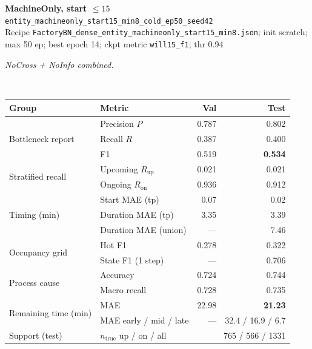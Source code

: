\documentclass[9pt,a4paper,twocolumn]{extarticle}
\begin{document}
\noindent\begin{minipage}{\columnwidth}
\begin{center}
{\small\bfseries MachineOnly, start $\le 15$}\\
{\scriptsize\texttt{entity\_machineonly\_start15\_min8\_cold\_ep50\_seed42}}\\
{\scriptsize Recipe \texttt{FactoryBN\_dense\_entity\_machineonly\_start15\_min8.json}; init scratch; max 50 ep; best epoch 14; ckpt metric \texttt{will15\_f1}; thr 0.94}\\[1pt]
\parbox{0.96\columnwidth}{\scriptsize\itshape NoCross + NoInfo combined.}\\[2pt]
\scriptsize\setlength{\tabcolsep}{3pt}
\begin{tabular}{llrr}
\toprule
Group & Metric & Val & Test \\
\midrule
\multirow{3}{*}{Bottleneck report}
  & Precision $P$ & 0.787 & 0.802 \\
  & Recall $R$ & 0.387 & 0.400 \\
  & F1 & 0.519 & \textbf{0.534} \\
\midrule
\multirow{2}{*}{Stratified recall}
  & Upcoming $R_{\mathrm{up}}$ & 0.021 & 0.021 \\
  & Ongoing $R_{\mathrm{on}}$ & 0.936 & 0.912 \\
\midrule
\multirow{3}{*}{Timing (min)}
  & Start MAE (tp) & 0.07 & 0.02 \\
  & Duration MAE (tp) & 3.35 & 3.39 \\
  & Duration MAE (union) & --- & 7.46 \\
\midrule
\multirow{2}{*}{Occupancy grid}
  & Hot F1 & 0.278 & 0.322 \\
  & State F1 (1 step) & --- & 0.706 \\
\midrule
\multirow{2}{*}{Process cause}
  & Accuracy & 0.724 & 0.744 \\
  & Macro recall & 0.728 & 0.735 \\
\midrule
\multirow{2}{*}{Remaining time (min)}
  & MAE & 22.98 & \textbf{21.23} \\
  & MAE early / mid / late & --- & 32.4 / 16.9 / 6.7 \\
\midrule
Support (test)
  & $n_{\mathrm{true}}$ up / on / all & \multicolumn{2}{r}{765 / 566 / 1331} \\
\bottomrule
\end{tabular}
\end{center}
\end{minipage}\par\vspace{6pt}
\end{document}
